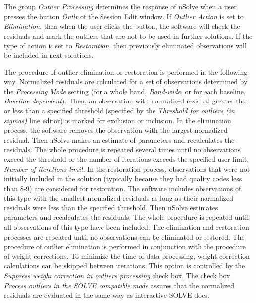 \documentclass [10pt,letterpaper]{report}
\newcommand{\nuSolve}{\greektext n\latintext Solve}
\begin{document}
The group {\sl Outlier Processing} determines the response of
\nuSolve{} when a user presses the button {\sl Outlr} of the Session
Edit window. If {\sl Outlier Action} is set to {\sl Elimination},
then when the user clicks the button, the software will check the
residuals and mark the outliers that are not to be used in further
solutions. If the type of action is set to {\sl Restoration}, then
previously eliminated observations will be included in next solutions.

The procedure of outlier elimination or restoration is performed in the
following way. Normalized residuals are calculated for a set of
observations determined by the {\sl Processing Mode} setting (for a
whole band, {\sl Band-wide}, or for each baseline, {\sl Baseline
dependent}). Then, an observation with normalized residual greater than
or less than a specified threshold (specified by the {\sl Threshold for
outliers (in sigmas)} line editor) is marked for exclusion or
inclusion. In the elimination process, the software removes the
observation with the largest normalized residual. Then \nuSolve{} makes
an estimate of parameters and recalculates the residuals. The whole
procedure is repeated several times until no observations exceed the
threshold or the number of iterations exceeds the specified user limit,
{\sl Number of iterations limit}. In the restoration process,
observations that were not initially included in the solution (typically
because they had quality codes less than 8-9) are considered for
restoration. The software includes observations of this type with the
smallest normalized residuals as long as their normalized residuals were
less than the specified threshold. Then \nuSolve{} estimates parameters
and recalculates the residuals. The whole procedure is repeated until
all observations of this type have been included. The elimination and
restoration processes are repeated until no observations can be
eliminated or restored. The procedure of outlier elimination is
performed in conjunction with the procedure of weight corrections. To
minimize the time of data processing, weight correction calculations can
be skipped between iterations. This option is controlled by the {\sl
Suppress weight correction in outliers processing} check box. The
check box {\sl Process outliers in the SOLVE compatible mode} assures
that the normalized residuals are evaluated in the same way as
interactive SOLVE does.
\end{document}

